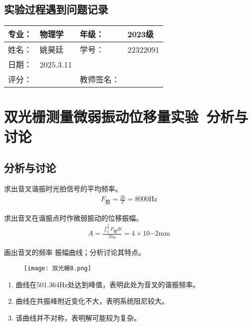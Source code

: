 \documentclass[dvipsnames, svgnames,a4paper,11pt]{article}
\renewcommand{\d}{\mathrm{d}}
\newcommand{\exname}{双光栅测量微弱振动位移量实验}%
\begin{document}
\subsection{实验过程遇到问题记录}


\clearpage
{}
\begin{table}
	\renewcommand\arraystretch{1.7}
	\begin{tabularx}{\textwidth}{|X|X|X|X|}
	\hline
	专业：& 物理学 &年级：& 2023级\\
	\hline
	姓名： &姚昊廷& 学号：&22322091 \\
	\hline
    日期：&2025.3.11 &  &\\
	\hline
	评分：&&教师签名：&\\
	\hline
	\end{tabularx}
\end{table}

\section{\exname\ \textbf{分析与讨论}}
\subsection{分析与讨论}
\begin{question}
    求出音叉谐振时光拍信号的平均频率。
    \tcblower
    \begin{align*}
        F_{\text{拍}}=\frac{2k}{T}=8000\text{Hz}
    \end{align*}
\end{question}

\begin{question}
    求出音叉在谐振点时作微弱振动的位移振幅。
    \tcblower
    \begin{align*}
        A=\frac{\int_{0}^{\frac{T}{2}}F_{\text{拍}}\d t}{2n_{\theta}}=4\times10{-2}\text{mm}
    \end{align*}
\end{question}

\begin{question}
    画出音叉的频率 振幅曲线；分析讨论其特点。
    \tcblower
    \begin{figure}[H]
        \centering
        \texttt{[image: 双光栅8.png]}
    \end{figure}
    \begin{enumerate}
        \item 曲线在501.364Hz处达到峰值，表明此处为音叉的谐振频率。
        \item 曲线在共振峰附近变化不大，表明系统阻尼较大。
        \item 该曲线并不对称，表明解可能较为复杂。
    \end{enumerate}
    
\end{question}
\end{document}
